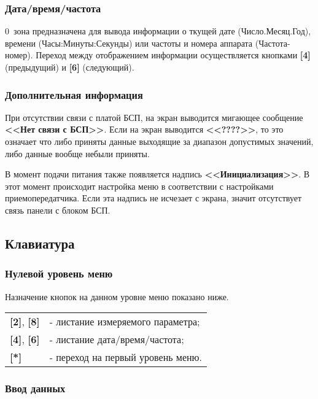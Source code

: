 \subsubsection{Дата/время/частота}

0~зона предназначена для вывода информации о ткущей дате (Число.Месяц.Год), времени (Часы:Минуты:Секунды) или частоты и номера аппарата (Частота-номер). Переход между отображением информации осуществляется кнопками \textbf{[4]} (предыдущий) и \textbf{[6]} (следующий).


\subsubsection{Дополнительная информация}

При отсутствии связи с платой БСП, на экран выводится мигающее сообщение \textbf{<<Нет связи с БСП>>}. Если на экран выводится \textbf{<<????>>}, то это означает что либо приняты данные выходящие за диапазон допустимых значений, либо данные вообще небыли приняты.

В момент подачи питания также появляется надпись \textbf{<<Инициализация>>}. В этот момент происходит настройка меню в соответствии с настройками приемопередатчика. Если эта надпись не исчезает с экрана, значит отсутствует связь панели с блоком БСП.
 
 
\subsection{Клавиатура} \label{ssec:keyboard}


\subsubsection{Нулевой уровень меню}

Назначение кнопок на данном уровне меню показано ниже.

\begin{center}
	\begin{tabular}{p{2cm} p{15cm}}
	    \textbf{[2]}, \textbf{[8]} & - листание измеряемого параметра; \tabularnewline
	    \textbf{[4]}, \textbf{[6]} & - листание дата/время/частота; \tabularnewline
	    \textbf{[*]} & - переход на первый уровень меню. 				
	\end{tabular} 
\end{center}


\subsubsection{Ввод данных} \label{sssec:keyboard_enter}

